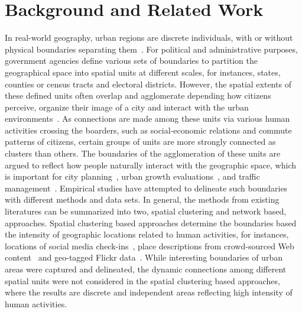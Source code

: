 \documentclass[]{tGIS2e}
\begin{document}
\section{Background and Related Work}
In real-world geography, urban regions are discrete individuals, with or without physical boundaries separating them~\citep{jiang2015}.
For political and administrative purposes, government agencies define various sets of boundaries to partition the geographical space into spatial units at different scales, for instances, states, counties or census tracts and electoral districts.
However, the spatial extents of these defined units often overlap and agglomerate depending how citizens perceive, organize their image of a city and interact with the urban environments~\citep{lynch1960}.
As connections are made among these units via various human activities crossing the boarders, such as social-economic relations and commute patterns of citizens, certain groups of units are more strongly connected as clusters than others. The boundaries of the agglomeration of these units are argued to reflect how people naturally interact with the geographic space, which is important for city planning~\citep{hollenstein2010}, urban growth evaluations~\citep{jiang2015,long2015}, and traffic management~\citep{gao2014}. 
Empirical studies have attempted to delineate such boundaries with different methods and data sets.
In general, the methods from existing literatures can be summarized into two, spatial clustering and network based, approaches.
Spatial clustering based approaches determine the boundaries based the intensity of geographic locations related to human activities, for instances, locations of social media check-ins~\citep{cranshaw2012,jiang2015,sun2016}, place descriptions from crowd-sourced Web content~\citep{vasardani2013} and geo-tagged Flickr data~\citep{stefanidis2013,hu2016}.
While interesting boundaries of urban areas were captured and delineated, the dynamic connections among different spatial units were not considered in the spatial clustering based approaches, where the results are discrete and independent areas reflecting high intensity of human activities.
\end{document}
